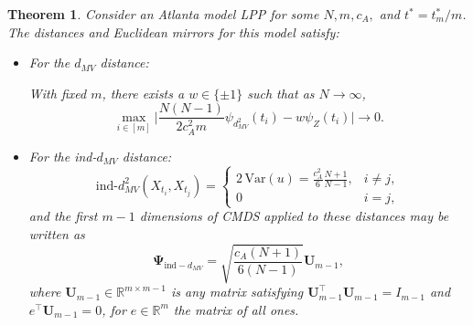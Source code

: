 \documentclass[12pt]{article}
\newcommand{\RR}{\mathbb{R}}
\newtheorem{thm}{Theorem}
\theoremstyle{definition}
\newcommand{\bU}{\mathbf{U}}
\newcommand{\tr}{\operatorname{tr}}
\begin{document}
\begin{thm}\label{thm:Atlanta-main}
Consider an Atlanta model LPP for some $N,m,c_A,$ and $t^*=t_m^*/m$. The distances and Euclidean mirrors for this model satisfy:
\begin{itemize}
\item For the $d_{MV}$ distance:

With fixed $m$, there exists a $w \in \{\pm1\}$ such that as $N \to \infty$,
$$
\max_{i \in [m]}\bigg| \frac{N(N-1)}{2c_A^2m}\psi_{d^2_{MV}}(t_i) -  w\psi_Z(t_i) \bigg| \to 0.
$$


\item For the ind-$d_{MV}$ distance:
$$ \text{ind-}d^2_{MV}(X_{t_i}, X_{t_j}) = 
   \begin{cases} 
     2\,\mathrm{Var}(u) = \frac{c_A^2}{6}\frac{N+1}{N-1} , & i \neq j,\\
     0 & i = j,
   \end{cases} 
$$
and the first $m-1$ dimensions of CMDS applied to these distances may be written as
$$
\mathbf{\Psi}_{\text{ind}-d_{MV}} = \sqrt{\frac{c_A(N+1)}{6(N-1)}} \bU_{m-1},
$$
where $\bU_{m-1}\in \RR^{m\times m-1}$ is any matrix satisfying $\bU^{\top}_{m-1}\bU_{m-1} = I_{m-1}$ and $e^\top \bU_{m-1}=0$, for $e\in\RR^m$ the matrix of all ones.


\end{itemize}
\end{thm}
\end{document}

